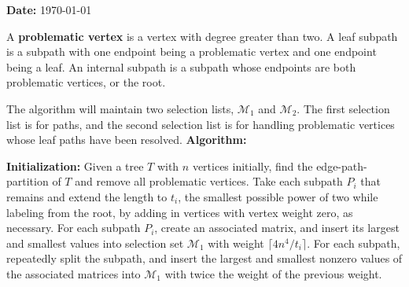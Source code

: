 \documentclass[12pt]{article}
\begin{document}

\begin{spacing}{3}
\noindent\textbf{Date:} \today
\vskip 0.2in\noindent
\begin{definition}
A \textbf{problematic vertex} is a vertex with degree greater than two. A leaf subpath is a subpath with one endpoint being a problematic vertex and one endpoint being a leaf. An internal subpath is a subpath whose endpoints are both problematic vertices, or the root.
\end{definition}
\vskip 0.2in\noindent
The algorithm will maintain two selection lists, $\mathcal{M}_1$ and $\mathcal{M}_2$. The first selection list is for paths, and the second selection list is for handling problematic vertices whose leaf paths have been resolved.
\vskip 0.2in\noindent
\textbf{Algorithm:}
\begin{algorithm*}[hbt]
\begin{algorithmic}[1]
\EndFor
\EndFor
\end{algorithmic}
\end{algorithm*}
\vskip 0.2in\noindent
\textbf{Initialization:}
Given a tree $T$ with $n$ vertices initially, find the edge-path-partition of $T$ and remove all problematic vertices. Take each subpath $P_i$ that remains and extend the length to $t_i$, the smallest possible power of two while labeling from the root, by adding in vertices with vertex weight zero, as necessary. For each subpath $P_i$, create an associated matrix, and insert its largest and smallest values into selection set $\mathcal{M}_1$ with weight $\lceil 4n^4/t_i\rceil$. For each subpath, repeatedly split the subpath, and insert the largest and smallest nonzero values of the associated matrices into $\mathcal{M}_1$ with twice the weight of the previous weight.

\end{spacing}
\end{document}
